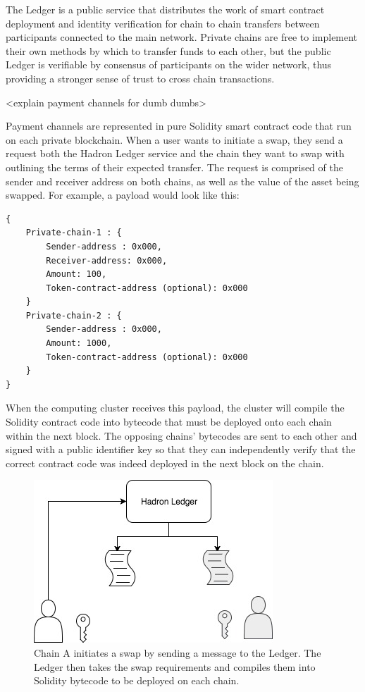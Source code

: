 \documentclass{article}
\begin{document}
The Ledger is a public service that distributes the work of smart contract deployment and identity verification for chain to chain transfers between participants connected to the main network. Private chains are free to implement their own methods by which to transfer funds to each other, but the public Ledger is verifiable by consensus of participants on the wider network, thus providing a stronger sense of trust to cross chain transactions.

<explain payment channels for dumb dumbs>

Payment channels are represented in pure Solidity smart contract code that run on each private blockchain. When a user wants to initiate a swap, they send a request both the Hadron Ledger service and the chain they want to swap with outlining the terms of their expected transfer. The request is comprised of the sender and receiver address on both chains, as well as the value of the asset being swapped. For example, a payload would look like this:

\begin{verbatim}
{
    Private-chain-1 : {
        Sender-address : 0x000,
        Receiver-address: 0x000,
        Amount: 100,
        Token-contract-address (optional): 0x000
    }
    Private-chain-2 : {
        Sender-address : 0x000,
        Amount: 1000,
        Token-contract-address (optional): 0x000
    }
}
\end{verbatim}

When the computing cluster receives this payload, the cluster will compile the Solidity contract code into bytecode that must be deployed onto each chain within the next block. The opposing chains’ bytecodes are sent to each other and signed with a public identifier key so that they can independently verify that the correct contract code was indeed deployed in the next block on the chain.

\begin{figure}[htbp!]
\centering
\includegraphics[scale=0.5]{fig1.jpg}
\caption{Chain A initiates a swap by sending a message to the Ledger. The Ledger then takes the swap requirements and compiles them into Solidity bytecode to be deployed on each chain.}
\end{figure}
\end{document}
